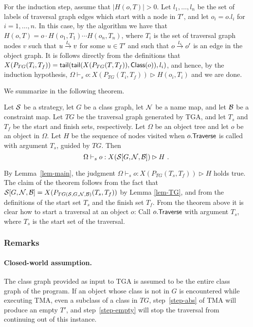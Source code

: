 For the induction step, assume that $|H(o,T)|>0$. Let $l_1,\ldots,l_n$
be the set of labels of traversal graph edges which start with a node
in $T'$, and let $o_i=o.l_i$ for $i=1,\ldots,n$.  In this case, by the
algorithm we have that $H(o,T)=o\cdot H(o_1,T_1)\cdots H(o_n,T_n)$,
where $T_i$ is the set of traversal graph nodes $v$ such that
$u\stackrel{l_i}{\rightarrow}v$ for some $u\in T'$ and such that $o\stackrel{l_i}{\rightarrow}o'$ is an edge in the object graph.  It is follows directly
from the definitions that
$X(P_{TG}(T_i,T_f))=\mbox{\sf tail}(\mbox{\sf tail}(X(P_{TG}(T,T_f)),\mbox{\sf Class}(o)),l_i)$, and
hence, by the induction hypothesis, $\Omega\vdash_s
o:X(P_{TG}(T_i,T_f))\rhd H(o_i,T_i)$ and we are done.
\QED

We summarize in the following theorem.
\begin{theorem}
Let ${\cal S}$ be a strategy, let $G$ be a class graph, let ${\cal N}$ be a name
map, and let ${\cal B}$ be a constraint map.  Let $TG$ be the traversal
graph generated by TGA, and let $T_s$ and $T_f$ be the start
and finish sets, respectively.  Let $\Omega$ be an object tree and let
$o$ be an object in $\Omega$.  Let $H$ be the sequence of nodes
visited when $o.\mbox{\sf Traverse}$ is called with argument $T_s$, guided by
$TG$.  Then
$$
\Omega\vdash_s o:X({\cal S}[G,{\cal N},{\cal B}])\rhd H~.
$$
\end{theorem}
\Proof
By Lemma~\ref{lem-main}, the judgment $\Omega\vdash_s
o:X(P_{TG}(T_s,T_f))\rhd H$ holds true.  The claim of the theorem
follows from the fact that
${\cal S}[G,{\cal N},{\cal B}]=X(P_{{\sl TG}({\cal S},G,{\cal N},{\cal B})}(T_s,T_f))$ by Lemma
\ref{lem-TG}, and from the definitions of the start set $T_s$ and the
finish set $T_f$.
\QED
%
From the theorem above it is clear how to start a traversal at an
object $o$: Call $o.\mbox{\sf Traverse}$ with argument $T_s$, where $T_s$ is the
start set of the traversal.


\subsubsection*{Remarks}

\paragraph{Closed-world assumption.}  The class graph provided as
input to TGA is assumed to be the entire class graph of the program.
If an object whose class is not in $G$ is encountered while executing
TMA, even a subclass of a class in $TG$, step~\ref{step-abs} of TMA
will produce an empty $T'$, and step~\ref{step-empty} will stop the
traversal from continuing out of this instance.


